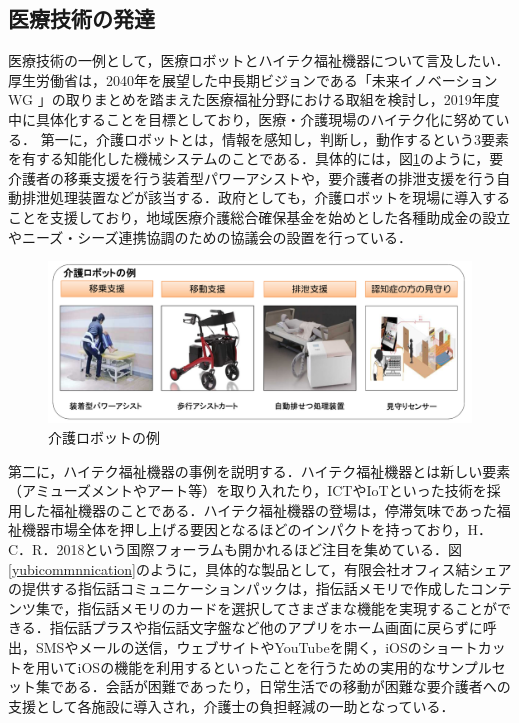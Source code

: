 \subsection{医療技術の発達}

医療技術の一例として，医療ロボットとハイテク福祉機器について言及したい． 厚生労働省は，2040年を展望した中長期ビジョンである「未来イノベーション WG 」の取りまとめを踏まえた医療福祉分野における取組を検討し，2019年度中に具体化することを目標としており，医療・介護現場のハイテク化に努めている\cite{care_robots}．
第一に，介護ロボットとは，情報を感知し，判断し，動作するという3要素を有する知能化した機械システムのことである．具体的には，図\ref{care_robots}のように，要介護者の移乗支援を行う装着型パワーアシストや，要介護者の排泄支援を行う自動排泄処理装置などが該当する．政府としても，介護ロボットを現場に導入することを支援しており，地域医療介護総合確保基金を始めとした各種助成金の設立やニーズ・シーズ連携協調のための協議会の設置を行っている．

\begin{figure}[htb]
 \begin{center}
 \includegraphics[scale=0.4]{figures/care_robots}
 \caption[介護ロボットの例]{介護ロボットの例 \label{care_robots}}
 \end{center}
\end{figure}

第二に，ハイテク福祉機器の事例を説明する．ハイテク福祉機器とは新しい要素（アミューズメントやアート等）を取り入れたり，ICTやIoTといった技術を採用した福祉機器のことである．ハイテク福祉機器の登場は，停滞気味であった福祉機器市場全体を押し上げる要因となるほどのインパクトを持っており，H．C．R．2018という国際フォーラムも開かれるほど注目を集めている．図\ref{yubicommnnication}のように，具体的な製品として，有限会社オフィス結シェアの提供する指伝話コミュニケーションパックは，指伝話メモリで作成したコンテンツ集で，指伝話メモリのカードを選択してさまざまな機能を実現することができる．指伝話プラスや指伝話文字盤など他のアプリをホーム画面に戻らずに呼出，SMSやメールの送信，ウェブサイトやYouTubeを開く，iOSのショートカットを用いてiOSの機能を利用するといったことを行うための実用的なサンプルセット集である．会話が困難であったり，日常生活での移動が困難な要介護者への支援として各施設に導入され，介護士の負担軽減の一助となっている．

